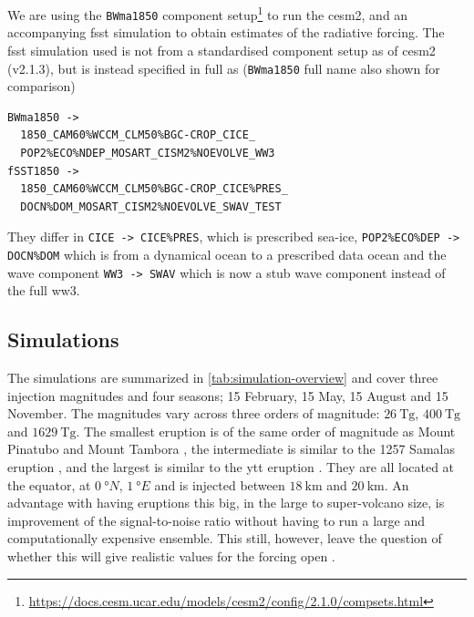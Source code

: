\documentclass{ametsocV5}
\begin{document}
We are using the \texttt{BWma1850} component
setup\footnote{\url{https://docs.cesm.ucar.edu/models/cesm2/config/2.1.0/compsets.html}}
to run the \acrshort{cesm2}, and an accompanying \acrfull{fsst} simulation to obtain
estimates of the radiative forcing. The \acrshort{fsst} simulation used is not from a
standardised component setup as of \acrshort{cesm2} (v2.1.3), but is instead specified
in full as (\texttt{BWma1850} full name also shown for comparison)
\begin{small}
  \begin{verbatim}
BWma1850 ->
  1850_CAM60%WCCM_CLM50%BGC-CROP_CICE_
  POP2%ECO%NDEP_MOSART_CISM2%NOEVOLVE_WW3
fSST1850 ->
  1850_CAM60%WCCM_CLM50%BGC-CROP_CICE%PRES_
  DOCN%DOM_MOSART_CISM2%NOEVOLVE_SWAV_TEST
  \end{verbatim}
\end{small}
They differ in \texttt{CICE -> CICE\%PRES}, which is prescribed sea-ice,
\texttt{POP2\%ECO\%DEP -> DOCN\%DOM} which is from a dynamical ocean to a prescribed
data ocean and the wave component \texttt{WW3 -> SWAV} which is now a stub wave
component instead of the full \acrfull{ww3}.

\subsection{Simulations}

The simulations are summarized in \cref{tab:simulation-overview} and cover three
 injection magnitudes and four seasons; 15 February, 15 May, 15 August and 15
November. The magnitudes vary across three orders of magnitude: \(\SI{26}{\tera\gram}\),
\(\SI{400}{\tera\gram}\) and \(\SI{1629}{\tera\gram}\). The smallest eruption is of the
same order of magnitude as Mount Pinatubo
\citep[\(\sim10\)--\(\SI{20}{\tera\gram}\);~e.g.][]{timmreck2018} and Mount Tambora
\citep[\(\sim\SI{56.2}{\tera\gram}\);~e.g.][]{zanchettin2016}, the intermediate is
similar to the 1257 Samalas eruption \citep[\(\sim
  119\)--\(\SI{250}{\tera\gram}\);~e.g.][]{toohey2017,ottobliesner2016}, and the largest
is similar to the \acrfull{ytt} eruption
\citep[\(100\)--\(\SI{10000}{\tera\gram}\);][and~references~therein]{jones2005}. They
are all located at the equator, at \(\SI{0}{\degree N}\), \(\SI{1}{\degree E}\) and
 is injected between \(\SI{18}{\kilo\meter}\) and \(\SI{20}{\kilo\meter}\). An
advantage with having eruptions this big, in the large to super-volcano size, is
improvement of the signal-to-noise ratio without having to run a large and
computationally expensive ensemble. This still, however, leave the question of whether
this will give realistic values for the forcing open \citep{gregory2016}.
\end{document}
